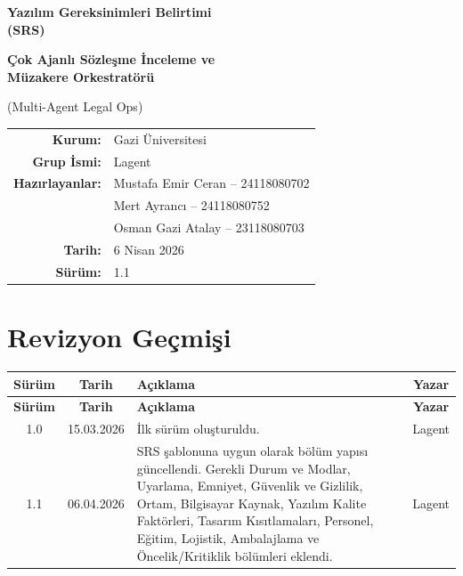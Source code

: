 \documentclass[12pt, a4paper]{article}
\begin{document}
\begin{titlepage}
\centering
\vspace*{2cm}

{\Huge\bfseries\color{darkblue} Yazılım Gereksinimleri Belirtimi\\[0.3cm] (SRS)}

\vspace{1.5cm}

{\LARGE\bfseries Çok Ajanlı Sözleşme İnceleme ve\\[0.2cm] Müzakere Orkestratörü}

\vspace{0.5cm}

{\Large (Multi-Agent Legal Ops)}

\vspace{2cm}

\begin{tabular}{r l}
\textbf{Kurum:} & Gazi Üniversitesi \\[0.4cm]
\textbf{Grup İsmi:} & Lagent \\[0.4cm]
\textbf{Hazırlayanlar:} & Mustafa Emir Ceran -- 24118080702 \\
                        & Mert Ayrancı -- 24118080752 \\
                        & Osman Gazi Atalay -- 23118080703 \\[0.4cm]
\textbf{Tarih:} & 6 Nisan 2026 \\[0.4cm]
\textbf{Sürüm:} & 1.1 \\
\end{tabular}

\vfill


\end{titlepage}

\newpage
\section*{Revizyon Geçmişi}

\begin{longtable}{|c|c|p{6cm}|c|}
\hline
\textbf{Sürüm} & \textbf{Tarih} & \textbf{Açıklama} & \textbf{Yazar} \\
\hline
\endfirsthead
\hline
\textbf{Sürüm} & \textbf{Tarih} & \textbf{Açıklama} & \textbf{Yazar} \\
\hline
\endhead
1.0 & 15.03.2026 & İlk sürüm oluşturuldu. & Lagent \\
\hline
1.1 & 06.04.2026 & SRS şablonuna uygun olarak bölüm yapısı güncellendi. Gerekli Durum ve Modlar, Uyarlama, Emniyet, Güvenlik ve Gizlilik, Ortam, Bilgisayar Kaynak, Yazılım Kalite Faktörleri, Tasarım Kısıtlamaları, Personel, Eğitim, Lojistik, Ambalajlama ve Öncelik/Kritiklik bölümleri eklendi. & Lagent \\
\hline
\end{longtable}
\end{document}
